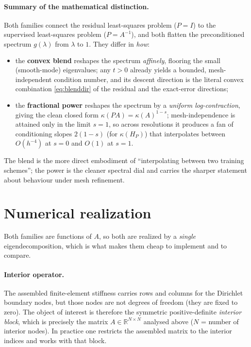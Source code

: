 \documentclass[11pt]{article}
\newcommand{\R}{\mathbb{R}}
\newcommand{\kk}{\kappa}
\begin{document}
\paragraph{Summary of the mathematical distinction.}
Both families connect the residual least-squares problem ($P=I$) to the supervised
least-squares problem ($P=A^{-1}$), and both flatten the preconditioned spectrum
$g(\lambda)$ from $\lambda$ to $1$. They differ in \emph{how}:
\begin{itemize}
  \item the \textbf{convex blend} reshapes the spectrum \emph{affinely}, flooring the small
        (smooth-mode) eigenvalues; any $t>0$ already yields a bounded, mesh-independent
        condition number, and its descent direction is the literal convex combination
        \eqref{eq:blenddir} of the residual and the exact-error directions;
  \item the \textbf{fractional power} reshapes the spectrum by a \emph{uniform log-contraction},
        giving the clean closed form $\kk(PA)=\kk(A)^{1-s}$; mesh-independence is attained
        only in the limit $s=1$, so across resolutions it produces a fan of conditioning
        slopes $2(1-s)$ (for $\kk(H_P)$) that interpolates between $O(h^{-4})$ at $s=0$ and
        $O(1)$ at $s=1$.
\end{itemize}
The blend is the more direct embodiment of ``interpolating between two training schemes'';
the power is the cleaner spectral dial and carries the sharper statement about behaviour
under mesh refinement.

\section{Numerical realization}
\label{sec:numerical}

Both families are functions of $A$, so both are realized by a \emph{single}
eigendecomposition, which is what makes them cheap to implement and to compare.

\paragraph{Interior operator.}
The assembled finite-element stiffness carries rows and columns for the Dirichlet boundary
nodes, but those nodes are not degrees of freedom (they are fixed to zero). The object of
interest is therefore the symmetric positive-definite \emph{interior block}, which is
precisely the matrix $A\in\R^{N\times N}$ analysed above ($N$ = number of interior nodes).
In practice one restricts the assembled matrix to the interior indices and works with that
block.
\end{document}
